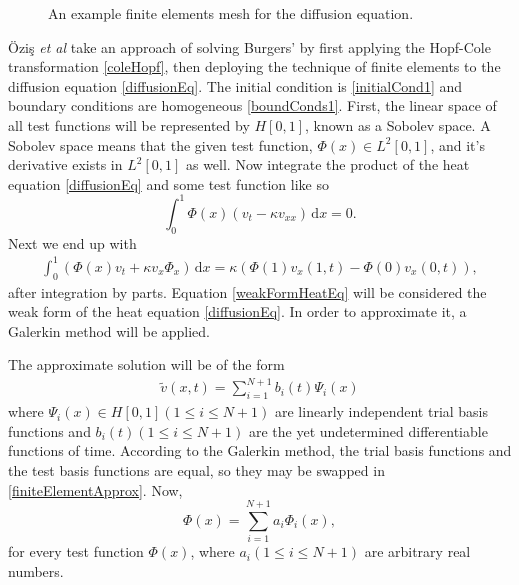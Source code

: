 \documentclass[undefended]{sfuthesis}
\begin{document}
\begin{figure}[h!]
\centering
{}
\caption{An example finite elements mesh for the diffusion equation.}
\label{fig:finiteElementsMesh}
\end{figure}

\"Ozi\c{s} \textit{et al} \cite{burgerFiniteElement} take an approach of solving Burgers' by first applying the Hopf-Cole transformation \eqref{coleHopf}, then deploying the technique of finite elements to the diffusion equation \eqref{diffusionEq}. The initial condition is \eqref{initialCond1} and boundary conditions are homogeneous \eqref{boundConds1}. First, the linear space of all test functions will be represented by $H[0, 1]$, known as a Sobolev space. A Sobolev space means that the given test function, $\Phi(x) \in L^2[0, 1]$, and it's derivative exists in $L^2[0, 1]$ as well. Now integrate the product of the heat equation \eqref{diffusionEq} and some test function like so \[\int_{0}^{1} \Phi(x) (v_t - \kappa v_{xx}) \,\mathrm{d} x = 0.\] Next we end up with
\begin{align}
\int_{0}^{1} \left(\Phi(x) v_t + \kappa v_x \Phi_x\right)  \,\mathrm{d} x = \kappa \left(\Phi(1) v_x(1, t) - \Phi(0) v_x(0,t) \right), \label{weakFormHeatEq}
\end{align}
after integration by parts. Equation \eqref{weakFormHeatEq} will be considered the weak form of the heat equation \eqref{diffusionEq}. In order to approximate it, a Galerkin method will be applied.

The approximate solution will be of the form 
\begin{align}
\widetilde{v}(x,t) = \sum_{i = 1}^{N + 1} b_i(t) \Psi_i(x) \label{finiteElementApprox}
\end{align}
where $\Psi_i(x) \in H[0, 1] (1 \leq i \leq N + 1)$ are linearly independent trial basis functions and $b_i(t) (1 \leq i \leq N + 1)$ are the yet undetermined differentiable functions of time. According to the Galerkin method, the trial basis functions and the test basis functions are equal, so they may be swapped in \eqref{finiteElementApprox}. Now, \[\Phi(x) = \sum_{i = 1}^{N + 1} a_i \Phi_i(x),\] for every test function $\Phi(x)$, where $a_i (1 \leq i \leq N + 1)$ are arbitrary real numbers.
\end{document}
